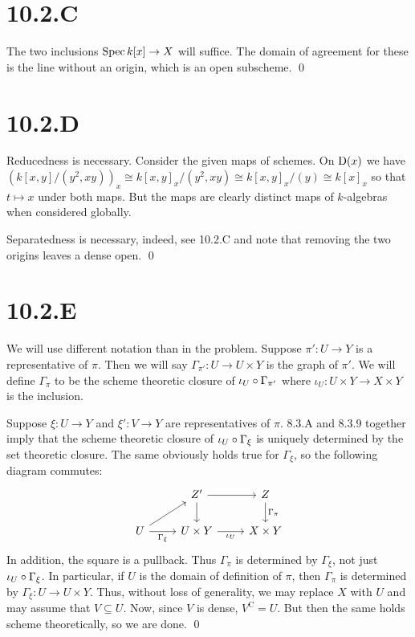 \documentclass{article}
\begin{document}
\section{10.2.C}
The two inclusions $\operatorname{Spec} k[x] \to X$ will suffice. The domain of agreement
for these is the line without an origin, which is an open subscheme. \qed

\section{10.2.D}
Reducedness is necessary. Consider the given maps of schemes. On
$\operatorname{D}(x)$ we have $(k[x,y]/(y^2, xy))_x \cong
    k[x,y]_x/(y^2, xy) \cong
    k[x,y]_x/(y) \cong k[x]_x$ so that
$t \mapsto x$ under both maps. But the maps are clearly distinct maps
of $k$-algebras when considered globally.

Separatedness is necessary, indeed, see 10.2.C and note that removing the two
origins leaves a dense open. \qed

\section{10.2.E}
We will use different notation than in the problem. Suppose
$\pi':U \to Y$ is a representative of $\pi$. Then we
will say $\Gamma_{\pi'}: U \to U \times Y$ is the graph of $\pi'$. We
will define $\Gamma_\pi$ to be the scheme theoretic closure of
$\iota_U \circ \Gamma_{\pi'}$ where $\iota_U: U\times Y \to X \times Y$ is the inclusion.

Suppose $\xi: U \to Y$ and $\xi': V \to Y$ are representatives
of $\pi$. 8.3.A and 8.3.9 together imply that the scheme
theoretic closure of $\iota_U \circ \Gamma_\xi$ is uniquely determined by the set
theoretic closure. The same obviously holds true for $\Gamma_\xi$,
so the following diagram commutes: \[\begin{tikzcd}
          & {Z'}        & Z            \\
        U & {U\times Y} & {X \times Y}
        \arrow["{\iota_U}"', from=2-2, to=2-3]
        \arrow["{\Gamma_\xi}"', from=2-1, to=2-2]
        \arrow["{\Gamma_\pi}", from=1-3, to=2-3]
        \arrow[from=1-2, to=1-3]
        \arrow[from=1-2, to=2-2]
        \arrow[from=2-1, to=1-2]
    \end{tikzcd}\] In addition, the
square is a pullback. Thus $\Gamma_\pi$ is determined by
$\Gamma_\xi$, not just $\iota_U \circ \Gamma_\xi$. In particular, if
$U$ is the domain of definition of $\pi$,
then $\Gamma_\pi$ is determined by $\Gamma_\xi: U \to U \times Y$. Thus,
without loss of generality, we may replace $X$ with
$U$ and may assume that $V \subseteq U$. Now, since
$V$ is dense, $V^\text{C}=U$. But then the same
holds scheme theoretically, so we are done. \qed
\end{document}

